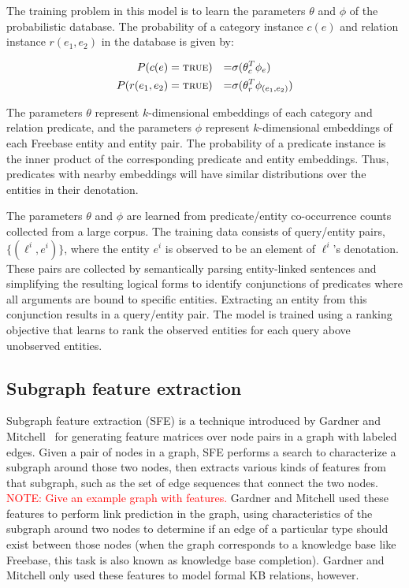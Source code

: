 \documentclass[11pt]{article}
\newcommand{\mattnote}[1]{\textcolor{red}{NOTE: #1}}
\newcommand{\predicate}[1]{\ensuremath{\textsc{#1}}}
\newcommand{\true}[0]{\predicate{true}}
\begin{document}
The training problem in this model is to learn the parameters $\theta$
and $\phi$ of the probabilistic database. The probability of a
category instance $c(e)$ and relation instance $r(e_1, e_2)$ in the
database is given by:

\begin{align*}
  P(c(e) & = \true{}) & = & \sigma ( \theta_c^T \phi_e ) \\
  P(r(e_1, e_2) & = \true{}) & = & \sigma ( \theta_r^T \phi_{(e_1, e_2)} )
\end{align*}

The parameters $\theta$ represent $k$-dimensional embeddings of each
category and relation predicate, and the parameters $\phi$ represent
$k$-dimensional embeddings of each Freebase entity and entity
pair. The probability of a predicate instance is the inner product of
the corresponding predicate and entity embeddings. Thus, predicates
with nearby embeddings will have similar distributions over the
entities in their denotation.

The parameters $\theta$ and $\phi$ are learned from predicate/entity
co-occurrence counts collected from a large corpus. The training data
consists of query/entity pairs, $\{(\ell^i, e^i)\}$, where the entity
$e^i$ is observed to be an element of $\ell^i$'s denotation. These
pairs are collected by semantically parsing entity-linked sentences
and simplifying the resulting logical forms to identify conjunctions
of predicates where all arguments are bound to specific
entities. Extracting an entity from this conjunction results in a
query/entity pair. The model is trained using a ranking objective that
learns to rank the observed entities for each query above unobserved
entities.

\subsection{Subgraph feature extraction}

Subgraph feature extraction (SFE) is a technique introduced by Gardner and
Mitchell~ for generating feature matrices over node
pairs in a graph with labeled edges.  Given a pair of nodes in a graph, SFE
performs a search to characterize a subgraph around those two nodes, then
extracts various kinds of features from that subgraph, such as the set of edge
sequences that connect the two nodes.  \mattnote{Give an example graph with
features.}  Gardner and Mitchell used these features to perform link
prediction in the graph, using characteristics of the subgraph around two nodes
to determine if an edge of a particular type should exist between those nodes
(when the graph corresponds to a knowledge base like Freebase, this task is
also known as knowledge base completion). Gardner and Mitchell only used these
features to model formal KB relations, however.
\end{document}
